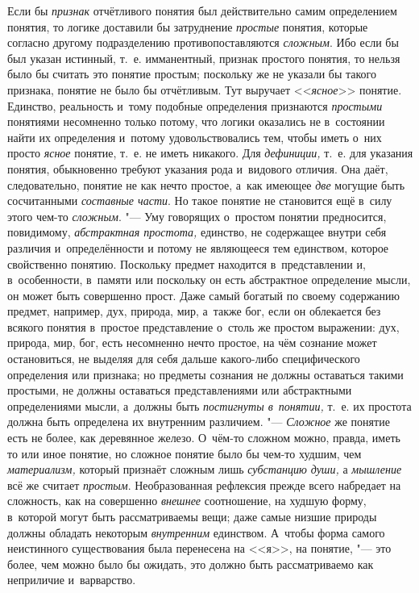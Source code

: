 Если бы {\em признак} отчётливого понятия был действительно самим определением
понятия, то логике доставили бы затруднение {\em простые} понятия,
которые согласно другому подразделению противопоставляются {\em сложным}. Ибо
если бы был указан истинный, т.~е. имманентный, признак простого понятия, то
нельзя было бы считать это понятие простым; поскольку же не указали бы
такого признака, понятие не было бы отчётливым. Тут выручает <<{\em ясное}>>
понятие. Единство, реальность и~тому подобные определения признаются
{\em простыми} понятиями несомненно только потому, что логики оказались не
в~состоянии найти их определения и~потому удовольствовались тем, чтобы иметь
о~них просто {\em ясное} понятие, т.~е. не иметь никакого. Для {\em дефиниции,}
т.~е. для указания понятия, обыкновенно требуют указания рода и~видового
отличия. Она даёт, следовательно, понятие не как нечто простое, а~как имеющее
{\em две} могущие быть сосчитанными {\em составные части}. Но такое понятие
не становится ещё в~силу этого чем-то {\em сложным}. "--- Уму говорящих
о~простом понятии предносится, повидимому, {\em абстрактная простота,}
единство, не содержащее внутри себя различия и~определённости
и потому не являющееся тем единством, которое свойственно понятию.
Поскольку предмет находится в~представлении и, в~особенности, в~памяти или
поскольку он есть абстрактное определение мысли, он может быть совершенно
прост. Даже самый богатый по своему содержанию предмет, например, дух,
природа, мир, а~также бог, если он облекается без всякого понятия в~простое
представление о~столь же простом выражении: дух, природа, мир, бог, есть
несомненно нечто простое, на чём сознание может остановиться, не выделяя
для себя дальше какого-либо специфического определения или признака; но
предметы сознания не должны оставаться такими простыми, не должны
оставаться представлениями или абстрактными определениями мысли, а~должны
быть {\em постигнуты в~понятии,} т.~е. их простота должна быть определена их
внутренним различием. "--- {\em Сложное} же понятие есть не более, как
деревянное железо. О~чём-то сложном можно, правда, иметь то или иное понятие,
но сложное понятие было бы чем-то худшим, чем {\em материализм,} который
признаёт сложным лишь {\em субстанцию души,} а {\em мышление} всё же считает
{\em простым}. Необразованная рефлексия прежде всего набредает на сложность,
как на совершенно {\em внешнее} соотношение, на худшую форму, в~которой могут
быть рассматриваемы вещи; даже самые низшие природы должны обладать некоторым
{\em внутренним} единством. А~чтобы форма самого неистинного существования была
перенесена на <<я>>, на понятие, "--- это более, чем можно было бы ожидать, это
должно быть рассматриваемо как неприличие и~варварство.

